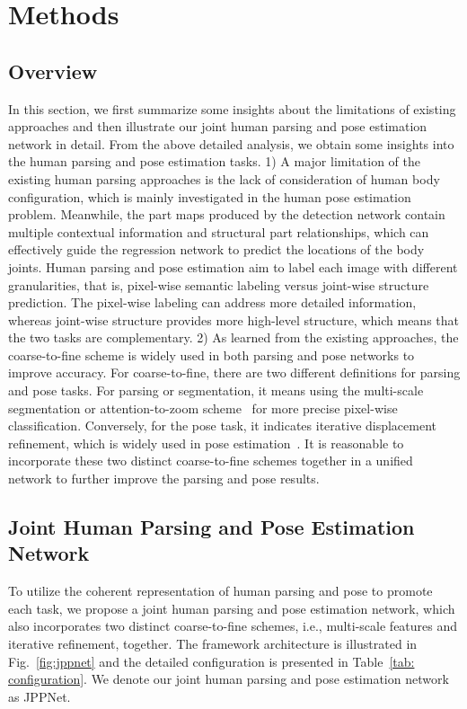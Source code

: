 \documentclass[10pt,journal,compsoc]{IEEEtran}
\begin{document}
\section{Methods}
\subsection{Overview}{In this section, we first summarize some insights about the limitations of existing approaches and then illustrate our joint human parsing and pose estimation network in detail.}
From the above detailed analysis, we obtain some insights into the human parsing and pose estimation tasks. 1) A major limitation of the existing human parsing approaches is the lack of consideration of human body configuration, which is mainly investigated in the human pose estimation problem. Meanwhile, the part maps produced by the detection network contain multiple contextual information and structural part relationships, which can effectively guide the regression network to predict the locations of the body joints. Human parsing and pose estimation aim to label each image with different granularities, that is, pixel-wise semantic labeling versus joint-wise structure prediction. The pixel-wise labeling can address more detailed information, whereas joint-wise structure provides more high-level structure, which means that the two tasks are complementary. 2) As learned from the existing approaches, the coarse-to-fine scheme is widely used in both parsing and pose networks to improve accuracy. For coarse-to-fine, there are two different definitions for parsing and pose tasks. For parsing or segmentation, it means using the multi-scale segmentation or attention-to-zoom scheme~\cite{chen2015attention} for more precise pixel-wise classification. Conversely, for the pose task, it indicates iterative displacement refinement, which is widely used in pose estimation~\cite{Wei_2016_CVPR}. It is reasonable to incorporate these two distinct coarse-to-fine schemes together in a unified network to further improve the parsing and pose results.


\subsection{Joint Human Parsing and Pose Estimation Network}
To utilize the coherent representation of human parsing and pose to promote each task, we propose a joint human parsing and pose estimation network, which also incorporates two distinct coarse-to-fine schemes, i.e., multi-scale features and iterative refinement, together. The framework architecture is illustrated in Fig.~\ref{fig:jppnet} and the detailed configuration is presented in Table~\ref{tab: configuration}. We denote our joint human parsing and pose estimation network as JPPNet.
\end{document}
